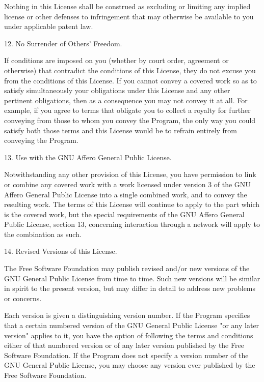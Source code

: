 \documentclass[11pt]{book}
\begin{document}
    Nothing in this License shall be construed as excluding or limiting
    any implied license or other defenses to infringement that may
    otherwise be available to you under applicable patent law.

    12. No Surrender of Others' Freedom.

    If conditions are imposed on you (whether by court order, agreement or
    otherwise) that contradict the conditions of this License, they do not
    excuse you from the conditions of this License.  If you cannot convey a
    covered work so as to satisfy simultaneously your obligations under this
    License and any other pertinent obligations, then as a consequence you may
    not convey it at all.  For example, if you agree to terms that obligate you
    to collect a royalty for further conveying from those to whom you convey
    the Program, the only way you could satisfy both those terms and this
    License would be to refrain entirely from conveying the Program.

    13. Use with the GNU Affero General Public License.

    Notwithstanding any other provision of this License, you have
    permission to link or combine any covered work with a work licensed
    under version 3 of the GNU Affero General Public License into a single
    combined work, and to convey the resulting work.  The terms of this
    License will continue to apply to the part which is the covered work,
    but the special requirements of the GNU Affero General Public License,
    section 13, concerning interaction through a network will apply to the
    combination as such.

    14. Revised Versions of this License.

    The Free Software Foundation may publish revised and/or new versions of
    the GNU General Public License from time to time.  Such new versions will
    be similar in spirit to the present version, but may differ in detail to
    address new problems or concerns.

    Each version is given a distinguishing version number.  If the
    Program specifies that a certain numbered version of the GNU General
    Public License "or any later version" applies to it, you have the
    option of following the terms and conditions either of that numbered
    version or of any later version published by the Free Software
    Foundation.  If the Program does not specify a version number of the
    GNU General Public License, you may choose any version ever published
    by the Free Software Foundation.
\end{document}
